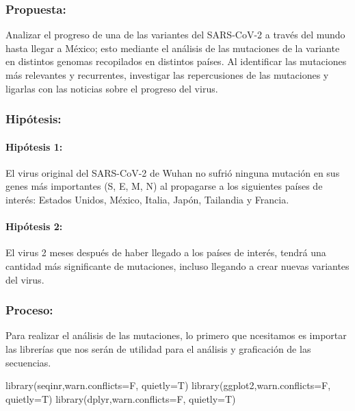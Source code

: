 \documentclass[
  12pt,
]{article}
\newenvironment{Shaded}{\begin{snugshade}}{\end{snugshade}}
\newcommand{\AttributeTok}[1]{\textcolor[rgb]{0.77,0.63,0.00}{#1}}
\newcommand{\FunctionTok}[1]{\textcolor[rgb]{0.00,0.00,0.00}{#1}}
\newcommand{\NormalTok}[1]{#1}
\begin{document}
\hypertarget{propuesta}{%
\subsubsection{Propuesta:}\label{propuesta}}

Analizar el progreso de una de las variantes del SARS-CoV-2 a través del
mundo hasta llegar a México; esto mediante el análisis de las mutaciones
de la variante en distintos genomas recopilados en distintos países. Al
identificar las mutaciones más relevantes y recurrentes, investigar las
repercusiones de las mutaciones y ligarlas con las noticias sobre el
progreso del virus.

\hypertarget{hipuxf3tesis}{%
\subsubsection{Hipótesis:}\label{hipuxf3tesis}}

\hypertarget{hipuxf3tesis-1}{%
\paragraph{Hipótesis 1:}\label{hipuxf3tesis-1}}

El virus original del SARS-CoV-2 de Wuhan no sufrió ninguna mutación en
sus genes más importantes (S, E, M, N) al propagarse a los siguientes
países de interés: Estados Unidos, México, Italia, Japón, Tailandia y
Francia.

\hypertarget{hipuxf3tesis-2}{%
\paragraph{Hipótesis 2:}\label{hipuxf3tesis-2}}

El virus 2 meses después de haber llegado a los países de interés,
tendrá una cantidad más significante de mutaciones, incluso llegando a
crear nuevas variantes del virus.

\hypertarget{proceso}{%
\subsubsection{Proceso:}\label{proceso}}

Para realizar el análisis de las mutaciones, lo primero que ncesitamos
es importar las librerías que nos serán de utilidad para el análisis y
graficación de las secuencias.

\begin{Shaded}
\begin{Highlighting}[]
\FunctionTok{library}\NormalTok{(seqinr,}\AttributeTok{warn.conflicts=}\NormalTok{F, }\AttributeTok{quietly=}\NormalTok{T)}
\FunctionTok{library}\NormalTok{(ggplot2,}\AttributeTok{warn.conflicts=}\NormalTok{F, }\AttributeTok{quietly=}\NormalTok{T)}
\FunctionTok{library}\NormalTok{(dplyr,}\AttributeTok{warn.conflicts=}\NormalTok{F, }\AttributeTok{quietly=}\NormalTok{T)}
\end{Highlighting}
\end{Shaded}
\end{document}
